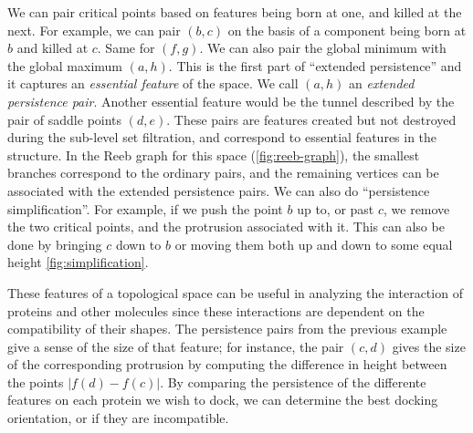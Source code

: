 \documentclass{article}
\begin{document}
We can pair critical points based on features being born at one, and killed at the next.
For example, we can pair $(b,c)$ on the basis of a component being born at $b$ and killed at $c$. Same for $(f,g)$. We can also pair the global minimum with the global maximum $(a,h)$. This is the first part of ``extended persistence'' and it captures an \emph{essential feature} of the space. We call $(a,h)$ an \emph{extended persistence pair}. Another essential feature would be the tunnel described by the pair of saddle points $(d,e)$.
These pairs are features created but not destroyed during the sub-level set filtration, and
correspond to essential features in the structure.
In the Reeb graph for this space (\cref{fig:reeb-graph}), the smallest branches correspond to the ordinary pairs, and the remaining vertices can be associated with the extended persistence pairs.
We can also do ``persistence simplification''. For example, if we push the point $b$ up to, or past $c$, we remove the two critical points, and the protrusion associated with it. This can also be done by bringing $c$ down
to $b$ or moving them both up and down to some equal height \cref{fig:simplification}.

These features of a topological space can be useful in analyzing the interaction of proteins and other molecules since these interactions are dependent on the compatibility of their shapes. The persistence pairs from the previous example give a sense of the size of that feature; for instance, the pair $(c,d)$ gives the size of the corresponding protrusion by computing the difference in height between the points $|f(d) - f(c)|$.
By comparing the persistence of the differente features on each protein we wish to dock, we can determine
the best docking orientation, or if they are incompatible.
\end{document}
